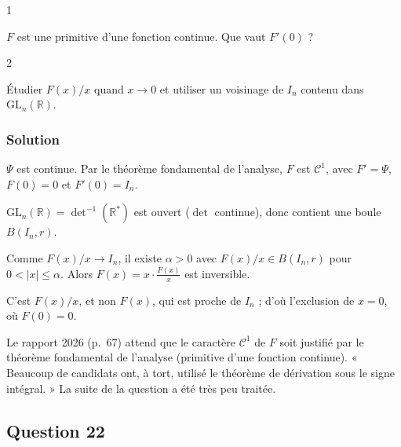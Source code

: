 \documentclass[11pt,a4paper]{article}
\newcommand{\equationajustee}[1]{%
  \sbox{\boiteequation}{$\displaystyle #1$}%
  \ifdim\wd\boiteequation>\linewidth
    \[\resizebox{\linewidth}{!}{\usebox{\boiteequation}}\]%
  \else
    \[#1\]%
  \fi}
\begin{document}
\begin{indication}{1}

\(F\) est une primitive d'une fonction continue. Que vaut \(F'(0)\) ?

\end{indication}

\begin{indication}{2}

Étudier \(F(x)/x\) quand \(x\to0\) et utiliser un voisinage de \(I_n\) contenu dans \({\mathrm{GL}}_n(\mathbb R)\).

\end{indication}

\hypertarget{solution-20}{%
\subsubsection{Solution}\label{solution-20}}

\(\Psi\) est continue. Par le théorème fondamental de l'analyse, \(F\) est \(\mathcal C^1\), avec \(F'=\Psi\), \(F(0)=0\) et \(F'(0)=I_n\).

\({\mathrm{GL}}_n(\mathbb R)=\det^{-1}(\mathbb R^*)\) est ouvert (\(\det\) continue), donc contient une boule \(B(I_n,r)\).

Comme \(F(x)/x\to I_n\), il existe \(\alpha>0\) avec \(F(x)/x\in B(I_n,r)\) pour \(0<|x|\le\alpha\). Alors \(F(x)=x\cdot\frac{F(x)}x\) est inversible.

\equationajustee{\boxed{F\in\mathcal C^1,\ \exists\alpha>0,\ F(x)\in{\mathrm{GL}}_n(\mathbb R)\ \text{pour}\ x\in[-\alpha,\alpha]\setminus\{0\}.}}

\begin{piege}

C'est \(F(x)/x\), et non \(F(x)\), qui est proche de \(I_n\) ; d'où l'exclusion de \(x=0\), où \(F(0)=0\).

\end{piege}

\begin{jury}

Le rapport 2026 (p.~67) attend que le caractère \(\mathcal C^1\) de \(F\) soit justifié par le théorème fondamental de l'analyse (primitive d'une fonction continue). « Beaucoup de candidats ont, à tort, utilisé le théorème de dérivation sous le signe intégral. » La suite de la question a été très peu traitée.

\end{jury}

\hypertarget{question-22}{%
\subsection{Question 22}\label{question-22}}
\end{document}
